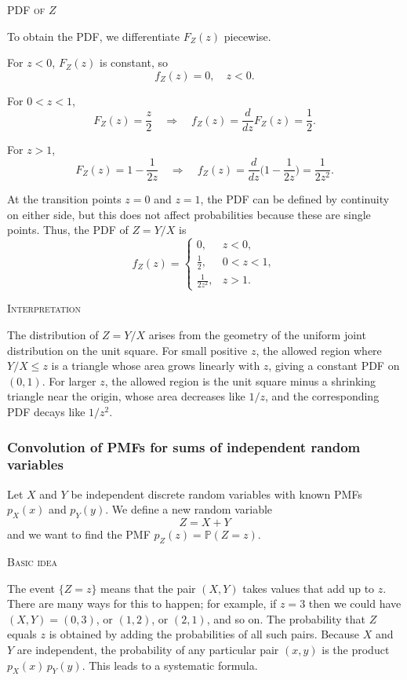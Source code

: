 \textsc{PDF of \(Z\)}

To obtain the PDF, we differentiate \(F_Z(z)\) piecewise.  

For \(z<0\), \(F_Z(z)\) is constant, so
\[
f_Z(z) = 0, \quad z<0.
\]

For \(0<z<1\),
\[
F_Z(z) = \frac{z}{2}
\quad\Longrightarrow\quad
f_Z(z)
=
\frac{d}{dz}F_Z(z)
=
\frac{1}{2}.
\]

For \(z>1\),
\[
F_Z(z)
=
1 - \frac{1}{2z}
\quad\Longrightarrow\quad
f_Z(z)
=
\frac{d}{dz}\Big(1 - \frac{1}{2z}\Big)
=
\frac{1}{2z^{2}}.
\]

At the transition points \(z=0\) and \(z=1\), the PDF can be defined by continuity on either side, but this does not affect probabilities because these are single points.  
Thus, the PDF of \(Z = Y/X\) is
\[
f_Z(z)
=
\begin{cases}
0, & z<0,\\[4pt]
\displaystyle \frac{1}{2}, & 0<z<1,\\[6pt]
\displaystyle \frac{1}{2z^{2}}, & z>1.
\end{cases}
\]

\textsc{Interpretation}

The distribution of \(Z = Y/X\) arises from the geometry of the uniform joint distribution on the unit square.  
For small positive \(z\), the allowed region where \(Y/X \le z\) is a triangle whose area grows linearly with \(z\), giving a constant PDF on \((0,1)\).  
For larger \(z\), the allowed region is the unit square minus a shrinking triangle near the origin, whose area decreases like \(1/z\), and the corresponding PDF decays like \(1/z^{2}\). 



\subsubsection{Convolution of PMFs for sums of independent random variables}

Let \(X\) and \(Y\) be independent discrete random variables with known PMFs \(p_X(x)\) and \(p_Y(y)\).  
We define a new random variable
\[
Z = X + Y
\]
and we want to find the PMF \(p_Z(z) = \mathbb{P}(Z = z)\).

\textsc{Basic idea}

The event \(\{Z = z\}\) means that the pair \((X,Y)\) takes values that add up to \(z\).  
There are many ways for this to happen; for example, if \(z=3\) then we could have \((X,Y) = (0,3)\), or \((1,2)\), or \((2,1)\), and so on.  
The probability that \(Z\) equals \(z\) is obtained by adding the probabilities of all such pairs.  
Because \(X\) and \(Y\) are independent, the probability of any particular pair \((x,y)\) is the product \(p_X(x)\,p_Y(y)\).  
This leads to a systematic formula.

